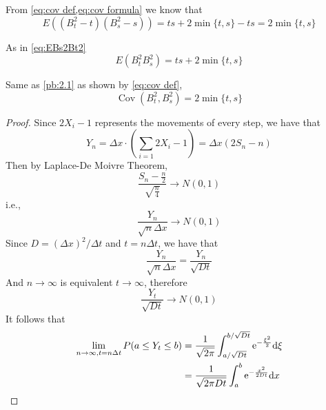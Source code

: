 \documentclass{homework}
\DeclareMathOperator{\Cov}{Cov}
\begin{document}
    \begin{subproblem}
        \item\label{pb:2.1}
        From \cref{eq:cov def,eq:cov formula} we know that
        \[E\left((B_t^2-t)(B_s^2-s)\right)=ts+2\min\{t,s\}-ts=2\min\{t,s\}\]

        \item
        As in \cref{eq:EBs2Bt2}
        \[E\left(B_t^2B_s^2\right)=ts+2\min\{t,s\}\]

        \item
        Same as \ref{pb:2.1} as shown by \cref{eq:cov def},
        \[\Cov(B_t^2,B_s^2)=2\min\{t,s\}\]
    \end{subproblem}

    \problem
    \begin{proof}
        Since $2X_i-1$ represents the movements of every step,
        we have that
        \[Y_n=\Delta x\cdot\left(\sum_{i=1}2X_i-1\right)
        =\Delta x(2S_n-n)\]
        Then by Laplace-De Moivre Theorem,
        \[\frac{S_n-\frac{n}{2}}{\sqrt{\frac{n}{4}}}\to N(0,1)\]
        i.e.,
        \[\frac{Y_n}{\sqrt{n}\Delta x}\to N(0,1)\]
        Since $D=(\Delta x)^2/\Delta t$ and $t=n\Delta t$,
        we have that
        \[\frac{Y_n}{\sqrt{n}\Delta x}=\frac{Y_n}{\sqrt{Dt}}\]
        And $n\to\infty$ is equivalent $t\to\infty$, therefore
        \[\frac{Y_t}{\sqrt{Dt}}\to N(0,1)\]
        It follows that
        \begin{align*}
        \lim_{n\to\infty,t=n\Delta t}P(a\leq Y_t\leq b)
        &=\frac{1}{\sqrt{2\pi}}
        \int_{a/\sqrt{Dt}}^{b/\sqrt{Dt}}\mathrm e^{-\frac{\xi^2}{2}}\mathrm d\xi\\
        &=\frac{1}{\sqrt{2\pi Dt}}
        \int_a^b\mathrm e^{-\frac{x^2}{2Dt}}\mathrm d x
        \end{align*}
    \end{proof}
\end{document}
